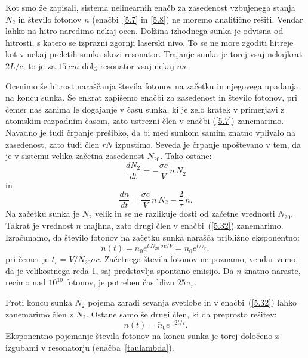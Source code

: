 Kot smo že zapisali, sistema nelinearnih enačb za zasedenost vzbujenega stanja $N_2$ 
in število fotonov $n$
(enačbi~\ref{5.7} in \ref{5.8}) ne moremo analitično rešiti. Vendar lahko na hitro
naredimo nekaj ocen. Dolžina izhodnega sunka je odvisna od hitrosti, 
s katero se izprazni zgornji laserski nivo. To se ne more zgoditi
hitreje kot v nekaj preletih sunka skozi resonator. Trajanje sunka je torej
vsaj nekajkrat $2L/c$, to je za $15~\si{cm}$ dolg resonator vsaj nekaj $\si{ns}$.

Ocenimo še hitrost naraščanja števila fotonov na začetku in 
njegovega upadanja na koncu sunka. Še enkrat zapišemo enačbi za zasedenost in število
fotonov, pri čemer nas zanima le dogajanje v času sunka,
ki je zelo kratek v primerjavi z atomskim razpadnim časom, zato 
ustrezni člen v enačbi (\ref{5.7}) zanemarimo. Navadno je tudi črpanje prešibko, da
bi med sunkom samim znatno vplivalo na zasedenost, zato tudi člen $rN$
izpustimo. Seveda je črpanje upoštevano v tem, da je v sistemu velika začetna 
zasedenost $N_{20}$. Tako ostane:
\begin{equation}
 \frac{d N_2}{d t}=-\frac{\sigma c}{V}\,n\,N_2 
 \label{5.32a}
\end{equation}
in 
\begin{equation}
 \frac{d n}{d t}=\frac{\sigma c}{V}\,n\,N_2 - \frac{2}{\tau}\,n.
 \label{5.32}
\end{equation}
Na začetku sunka je $N_2$ velik in se ne razlikuje dosti 
od začetne vrednosti $N_{20}$. Takrat 
je vrednost $n$ majhna, zato drugi člen v enačbi~(\ref{5.32})  
zanemarimo. Izračunamo, da število fotonov
na začetku sunka narašča približno eksponentno:
\begin{equation}  
n(t)=n_0e^{t\,N_{20}\,\sigma c/V}= n_0e^{t/\tau_r},
\label{5.33}
\end{equation}
pri čemer je $t_r = V/N_{20} \sigma c$.
Začetnega števila fotonov ne poznamo, vendar vemo, da je velikostnega reda 1,
saj predstavlja spontano emisijo. Da $n$ znatno naraste, recimo nad 
$10^{10}$ fotonov, je potreben čas blizu $25~\tau_r$.

Proti koncu sunka $N_2$ pojema zaradi sevanja svetlobe in v enačbi~(\ref{5.32}) lahko 
zanemarimo člen z $N_2$. Ostane samo še drugi člen, ki da preprosto rešitev:
\begin{equation}  
n(t)=\tilde{n}_0e^{-2t/\tau}.
\label{5.33a}
\end{equation}
Eksponentno pojemanje števila fotonov na koncu sunka je torej določeno z izgubami
v resonatorju (enačba~\ref{taulambda}). 

